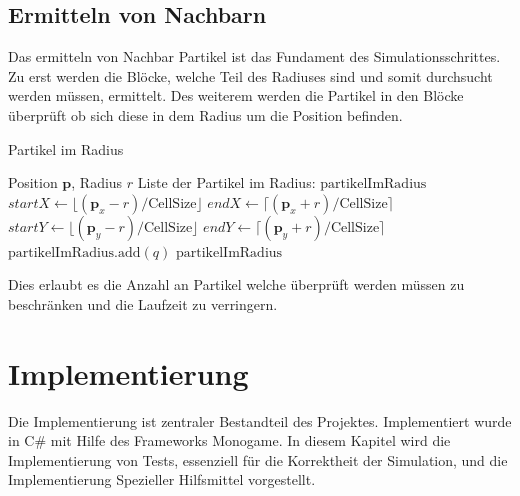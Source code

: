\documentclass[a4paper, 12pt]{article}
\begin{document}
\subsection{Ermitteln von Nachbarn}
Das ermitteln von Nachbar Partikel ist das Fundament des Simulationsschrittes. Zu erst werden die Blöcke, welche Teil des Radiuses sind und somit durchsucht werden müssen, ermittelt. Des weiterem werden die Partikel in den Blöcke überprüft ob sich diese in dem Radius um die Position befinden.
\begin{algorithm}[H]
    \caption{Partikel im Radius}
    \begin{algorithmic}[1]
		\Require Position $\mathbf{p}$, Radius $r$
        \Ensure Liste der Partikel im Radius: $\text{partikelImRadius}$
        \State $startX \leftarrow \lfloor (\mathbf{p}_x - r) / \text{CellSize} \rfloor$
        \State $endX \leftarrow \lceil (\mathbf{p}_x + r) / \text{CellSize} \rceil$
        \State $startY \leftarrow \lfloor (\mathbf{p}_y - r) / \text{CellSize} \rfloor$
        \State $endY \leftarrow \lceil (\mathbf{p}_y + r) / \text{CellSize} \rceil$
                            \State $\text{partikelImRadius}.\text{add}(q)$
                        \EndIf
                    \EndFor
                \EndIf
            \EndFor
        \EndFor
        \Return $\text{partikelImRadius}$
    \end{algorithmic}
\end{algorithm}
Dies erlaubt es die Anzahl an Partikel welche überprüft werden müssen zu beschränken und die Laufzeit zu verringern. 

\section{Implementierung} \label{section_5}
Die Implementierung ist zentraler Bestandteil des Projektes. Implementiert wurde in C\# mit Hilfe des Frameworks Monogame. In diesem Kapitel wird die Implementierung von Tests, essenziell für die Korrektheit der Simulation, und die Implementierung Spezieller Hilfsmittel vorgestellt. 
\end{document}
